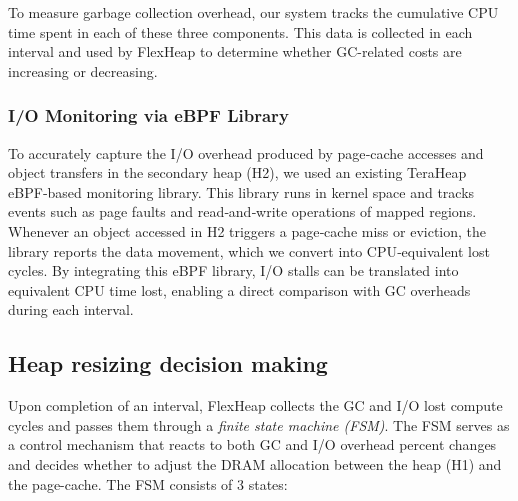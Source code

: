 %
%

To measure garbage collection overhead, our system tracks the cumulative CPU time spent in each of these three components.
This data is collected in each interval and used by FlexHeap to determine whether GC-related costs are increasing or decreasing.

\subsubsection{I/O Monitoring via eBPF Library}  %

To accurately capture the I/O overhead produced by page‑cache accesses and
object transfers in the secondary heap (H2), we used an existing TeraHeap
eBPF‑based monitoring library. This library runs in kernel space and tracks
events such as page faults and read‑and‑write operations of mapped regions.
Whenever an object accessed in H2 triggers a page‑cache miss or eviction, the
library reports the data movement, which we convert into CPU‑equivalent lost
cycles. By integrating this eBPF library, I/O stalls can be translated into
equivalent CPU time lost, enabling a direct comparison with GC overheads during
each interval.

\subsection{Heap resizing decision making} %

Upon completion of an interval, FlexHeap collects the GC and I/O lost compute cycles and passes them through
a \textit{finite state machine (FSM)}. The FSM serves as a control mechanism
that reacts to both GC and I/O overhead percent changes and decides whether to adjust the DRAM allocation
between the heap (H1) and the page-cache. The FSM consists of 3 states:


